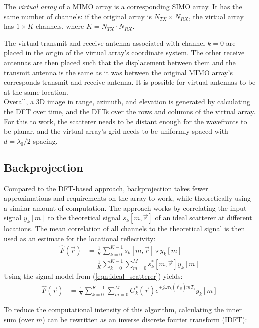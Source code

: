 The \textit{virtual array} of a MIMO array is a corresponding SIMO array.
It has the same number of channels:
if the original array is $N_{TX} \times N_{RX}$, the virtual array has $1 \times K$ channels, where $K=N_{TX} \cdot N_{RX}$.

The virtual transmit and receive antenna associated with channel $k=0$ are placed in the origin of the virtual array's coordinate system.
The other receive antennas are then placed such that the displacement between them and the transmit antenna
is the same as it was between the original MIMO array's corresponds transmit and receive antenna.
It is possible for virtual antennas to be at the same location.
\\

Overall, a 3D image in range, azimuth, and elevation is generated
by calculating the DFT over time, and the DFTs over the rows and columns of the virtual array.
For this to work, the scatterer needs to be distant enough for the wavefronts to be planar,
and the virtual array's grid needs to be uniformly spaced with $d=\lambda_0/2$ spacing.

\subsection{Backprojection}
\label{ssec:bp_imaging_theory}
Compared to the DFT-based approach, backprojection takes fewer approximations and requirements on the array to work,
while theoretically using a similar amount of computation.
The approach works by correlating the input signal $y_k[m]$
to the theoretical signal $s_k[m, \vec r]$ of an ideal scatterer at different locations.
The mean correlation of all channels to the theoretical signal is then used as an estimate for the locational reflectivity:
\begin{align}
    \hat F(\vec r) & = \frac{1}{K} \sum_{k=0}^{K-1} s_k[m, \vec r] \star y_k[m]             \\
                   & = \frac{1}{K}\sum_{k=0}^{K-1}\sum_{m=0}^{M} s_k^\ast[m, \vec r] y_k[m]
\end{align}
Using the signal model from (\ref*{eqn:ideal_scatterer}) yields:
\begin{align}
    \hat F(\vec r) & = \frac{1}{K}\sum_{k=0}^{K-1}\sum_{m=0}^{M}
    G_k^\ast(\vec r)e^{+j\dot\omega\tau_k(\vec r_S)mT_s} y_k[m]
\end{align}

To reduce the computational intensity of this algorithm,
calculating the inner sum (over $m$) can be rewritten as an inverse discrete fourier transform (IDFT):

